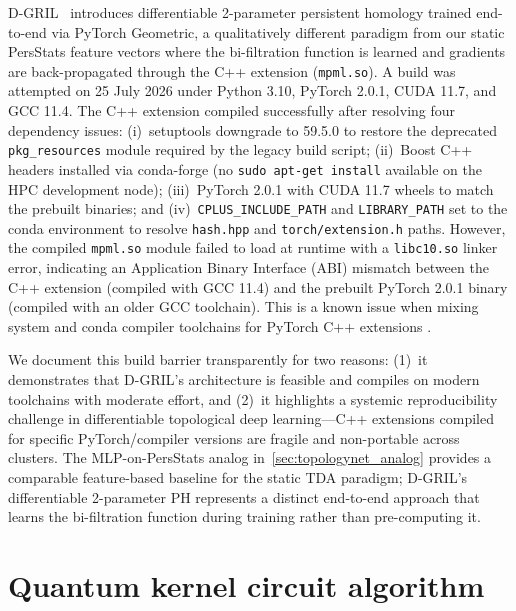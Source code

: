 \documentclass[11pt,a4paper]{article}
\begin{document}
D-GRIL~\citep{dgril_2026} introduces differentiable 2-parameter persistent homology trained end-to-end via PyTorch Geometric, a qualitatively different paradigm from our static PersStats feature vectors where the bi-filtration function is learned and gradients are back-propagated through the C++ extension (\texttt{mpml.so}). A build was attempted on 25 July 2026 under Python 3.10, PyTorch 2.0.1, CUDA 11.7, and GCC 11.4. The C++ extension compiled successfully after resolving four dependency issues: (i)~setuptools downgrade to 59.5.0 to restore the deprecated \texttt{pkg\_resources} module required by the legacy build script; (ii)~Boost C++ headers installed via conda-forge (no \texttt{sudo apt-get install} available on the HPC development node); (iii)~PyTorch 2.0.1 with CUDA 11.7 wheels to match the prebuilt binaries; and (iv)~\texttt{CPLUS\_INCLUDE\_PATH} and \texttt{LIBRARY\_PATH} set to the conda environment to resolve \texttt{hash.hpp} and \texttt{torch/extension.h} paths. However, the compiled \texttt{mpml.so} module failed to load at runtime with a \texttt{libc10.so} linker error, indicating an Application Binary Interface (ABI) mismatch between the C++ extension (compiled with GCC 11.4) and the prebuilt PyTorch 2.0.1 binary (compiled with an older GCC toolchain). This is a known issue when mixing system and conda compiler toolchains for PyTorch C++ extensions \citep{pytorch_cpp_extension}.

We document this build barrier transparently for two reasons: (1)~it demonstrates that D-GRIL's architecture is feasible and compiles on modern toolchains with moderate effort, and (2)~it highlights a systemic reproducibility challenge in differentiable topological deep learning—C++ extensions compiled for specific PyTorch/compiler versions are fragile and non-portable across clusters. The MLP-on-PersStats analog in~\cref{sec:topologynet_analog} provides a comparable feature-based baseline for the static TDA paradigm; D-GRIL's differentiable 2-parameter PH represents a distinct end-to-end approach that learns the bi-filtration function during training rather than pre-computing it.


\section{Quantum kernel circuit algorithm}
\label{sec:qkernel_algorithm}
\end{document}
